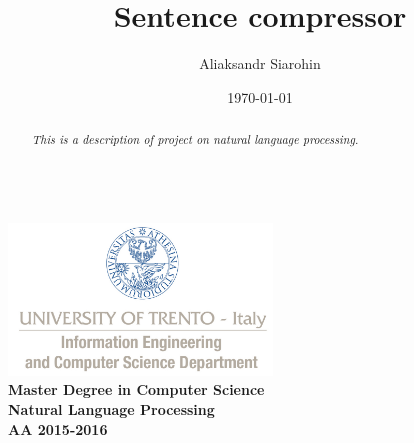 \documentclass[a4paper,12pt,oneside]{article}
\title{Sentence compressor}
\author{Aliaksandr Siarohin}
\date{\today}
\begin{document}
\makeatletter  %
\begin{titlepage}
      \centering
      ~~~~~~~~~~~~~\\[-30mm]
      \includegraphics[keepaspectratio=true, width=7cm]{bg_eng_1r.jpg} \\[10mm]

     {
     \large \bfseries Master Degree in Computer Science\\[3mm] 
     Natural Language Processing\\[3mm]
     AA 2015-2016
     }\\[10mm]


     \vspace{0.5cm}
     {
     \Large \bfseries \textcolor{blue}{\@title} \par
     }
     \vspace{0.5cm}
     \vspace{0.2cm}

     {\large {\@author}}
     \\ \vspace{.2cm}
     \@date

     \vspace{0.6cm}


\begin{abstract}

\textit{
  This is a description of project on natural language processing.
}


\end{abstract}

\end{titlepage}
\end{document}
